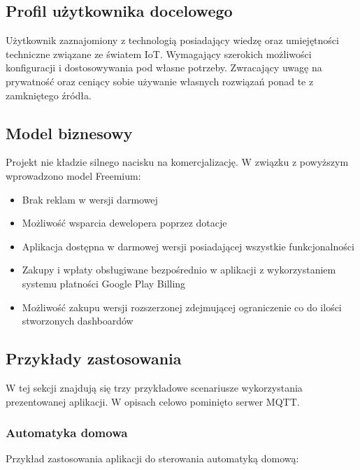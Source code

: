 \newpage


\newpage

\subsection{Profil użytkownika docelowego}
Użytkownik zaznajomiony z technologią posiadający wiedzę oraz umiejętności techniczne związane ze światem IoT. Wymagający szerokich możliwości konfiguracji i dostosowywania pod własne potrzeby. Zwracający uwagę na prywatność oraz ceniący sobie używanie własnych rozwiązań ponad te z zamkniętego źródła.

\subsection{Model biznesowy}
Projekt nie kładzie silnego nacisku na komercjalizację. W związku z powyższym wprowadzono model Freemium:
\begin{itemize}[leftmargin=*]
    \item Brak reklam w wersji darmowej
    \item Możliwość wsparcia dewelopera poprzez dotacje
    \item Aplikacja dostępna w darmowej wersji posiadającej wszystkie funkcjonalności
    \item Zakupy i wpłaty obsługiwane bezpośrednio w aplikacji z wykorzystaniem systemu płatności Google Play Billing
    \item Możliwość zakupu wersji rozszerzonej zdejmującej ograniczenie co do ilości stworzonych dashboardów
\end{itemize}

\newpage

\subsection{Przykłady zastosowania}
W tej sekcji znajdują się trzy przykładowe scenariusze wykorzystania prezentowanej aplikacji. W opisach celowo pominięto serwer MQTT.

\subsubsection{Automatyka domowa}
Przykład zastosowania aplikacji do sterowania automatyką domową:\\

